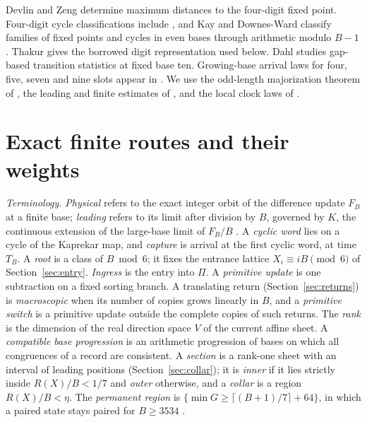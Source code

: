 \documentclass[11pt,reqno]{amsart}
\theoremstyle{definition}
\begin{document}
Devlin and Zeng \cite[Theorem~1.1]{DZ} determine maximum distances to the
four-digit fixed point. Four-digit cycle classifications include
\cite{G1,COST}, and Kay and Downes-Ward \cite{KDE} classify families of
fixed points and cycles in even bases through arithmetic modulo \(B-1\).
Thakur \cite[Section~2.7]{Thakur} gives the borrowed digit representation
used below. Dahl \cite{Dahl} studies gap-based transition statistics at
fixed base ten. Growing-base arrival laws for four, five, seven and nine
slots appear in \cite{G2,G3,G5,G4}. We use the odd-length majorization
theorem of \cite{G4}, the leading and finite estimates of \cite{G6}, and
the local clock laws of \cite{G7}.

\section{Exact finite routes and their weights}\label{sec:routes}

\emph{Terminology.} \emph{Physical} refers to the exact integer orbit of
the difference update \(F_B\) at a finite base; \emph{leading} refers to its
limit after division by \(B\), governed by \(K\), the continuous extension
of the large-base limit of \(F_B/B\) \cite[Section~2]{G6}. A \emph{cyclic
word} lies on a cycle of the Kaprekar map, and \emph{capture} is arrival at
the first cyclic word, at time \(T_B\). A \emph{root} is a class of
\(B\bmod6\); it fixes the entrance lattice \(X_i\equiv iB\pmod6\) of
Section~\ref{sec:entry}. \emph{Ingress} is the entry into \(\Pi\). A
\emph{primitive update} is one subtraction on a fixed sorting branch. A
translating return (Section~\ref{sec:returns}) is \emph{macroscopic} when
its number of copies grows linearly in \(B\), and a \emph{primitive switch}
is a primitive update outside the complete copies of such returns. The
\emph{rank} is the dimension of the real direction space \(V\) of the
current affine sheet. A \emph{compatible base progression} is an arithmetic
progression of bases on which all congruences of a record are consistent.
A \emph{section} is a rank-one sheet with an interval of leading positions
(Section~\ref{sec:collar}); it is \emph{inner} if it lies strictly inside
\(R(X)/B<1/7\) and \emph{outer} otherwise, and a \emph{collar} is a region
\(R(X)/B<\eta\). The \emph{permanent region} is
\(\{\min G\ge\lceil(B+1)/7\rceil+64\}\), in which a paired state stays
paired for \(B\ge3534\) \cite[Section~6]{G6}.
\end{document}
